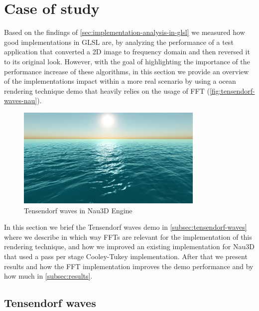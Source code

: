 \documentclass[
  oneside,
  11pt, a4paper,
  footinclude=true,
  headinclude=true,
  cleardoublepage=empty
]{scrbook}
\begin{document}
\section{Case of study} \label{sec:case-of-study}

Based on the findings of \autoref{sec:implementation-analysis-in-glsl} we measured how good implementations in GLSL are, by analyzing the performance of a test application that converted a 2D image to frequency domain and then reversed it to its original look. However, with the goal of highlighting the importance of the performance increase of these algorithms, in this section we provide an overview of the implementations impact within a more real scenario by using a ocean rendering technique demo that heavily relies on the usage of FFT (\autoref{fig:tensendorf-waves-nau}).
\newline

\begin{figure}[H] 
    \centering
    \includegraphics[width=0.8\textwidth]{img/ocean.png}
    \caption{Tensendorf waves in Nau3D Engine}
    \label{fig:tensendorf-waves-nau}
\end{figure}

In this section we brief the Tensendorf waves demo in \autoref{subsec:tensendorf-waves} where we describe in which way FFTs are relevant for the implementation of this rendering technique, and how we improved an existing implementation for Nau3D that used a pass per stage Cooley-Tukey implementation. After that we present results and how the FFT implementation improves the demo performance and by how much in \autoref{subsec:results}.

\subsection{Tensendorf waves} \label{subsec:tensendorf-waves}
\end{document}

